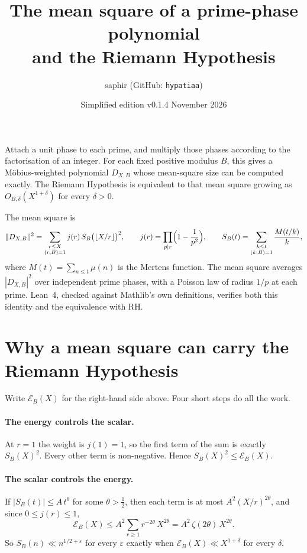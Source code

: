\documentclass[11pt]{article}
\title{The mean square of a prime-phase polynomial\\ and the Riemann Hypothesis}
\author{saphir (GitHub: \texttt{hypatiaa})}
\date{Simplified edition v0.1.4 \quad 23 November 2026}
\newcommand{\E}{\mathscr{E}}
\begin{document}
\maketitle

\noindent Attach a unit phase to each prime, and multiply those phases according to the factorisation of an integer. For each fixed positive modulus $B$, this gives a M\"obius-weighted polynomial $D_{X,B}$ whose mean-square size can be computed exactly. The Riemann Hypothesis is equivalent to that mean square growing as $O_{B,\delta}(X^{1+\delta})$ for every $\delta > 0$.

The mean square is
\[
\|D_{X,B}\|^2 = \sum_{\substack{r \le X\\ (r,B)=1}} j(r)\, S_B\bigl(\lfloor X/r \rfloor\bigr)^2,
\qquad
j(r) = \prod_{p \mid r}\Bigl(1 - \frac{1}{p^2}\Bigr),
\qquad
S_B(t) = \sum_{\substack{k \le t\\ (k,B)=1}} \frac{M(t/k)}{k},
\]
where $M(t) = \sum_{n \le t} \mu(n)$ is the Mertens function. The mean square averages $|D_{X,B}|^2$ over independent prime phases, with a Poisson law of radius $1/p$ at each prime. Lean~4, checked against Mathlib's own definitions, verifies both this identity and the equivalence with RH.

\section{Why a mean square can carry the Riemann Hypothesis}

Write $\E_B(X)$ for the right-hand side above. Four short steps do all the work.

\paragraph{The energy controls the scalar.} At $r = 1$ the weight is $j(1)=1$, so the first term of the sum is exactly $S_B(X)^2$. Every other term is non-negative. Hence $S_B(X)^2 \le \E_B(X)$.

\paragraph{The scalar controls the energy.} If $|S_B(t)| \le A\,t^{\theta}$ for some $\theta > \tfrac12$, then each term is at most $A^2 (X/r)^{2\theta}$, and since $0 \le j(r) \le 1$,
\[
\E_B(X) \le A^2 \sum_{r \ge 1} r^{-2\theta}\, X^{2\theta} = A^2\,\zeta(2\theta)\, X^{2\theta}.
\]
So $S_B(n) \ll n^{1/2+\varepsilon}$ for every $\varepsilon$ exactly when $\E_B(X) \ll X^{1+\delta}$ for every $\delta$.
\end{document}
